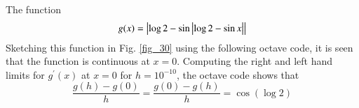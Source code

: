 The function
%
\begin{equation}
g(x)=\left\vert\log 2-\sin\left\vert\log 2-\sin x\right\vert\right\vert
\end{equation}
%
Sketching this function in Fig. \ref{fig_30} using the following octave code, it is seen that the function is continuous at $x = 0$.  Computing the right and left hand limits for $g^{\prime}(x)$ at $x = 0$ for $h = 10^{-10}$, the octave code shows that
%
\begin{equation}
\frac{g(h)-g(0)}{h} = \frac{g(0)-g(h)}{h} = \cos(\log 2)
\end{equation}
%

